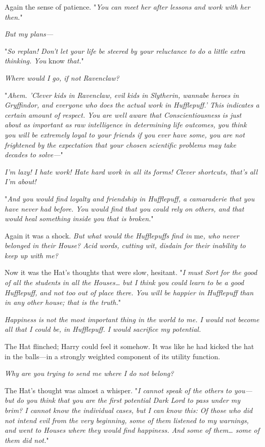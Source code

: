 Again the sense of patience. "\emph{You can meet her after lessons and work 
with her then.}"

\emph{But my plans---}

"\emph{So replan! Don't let your life be steered by your reluctance to do a 
little extra thinking. You} know\emph{ that.}"

\emph{Where would I go, if not Ravenclaw?}

"\emph{Ahem. 'Clever kids in Ravenclaw, evil kids in Slytherin, wannabe heroes 
in Gryffindor, and everyone who does the actual work in Hufflepuff.' This 
indicates a certain amount of respect. You are well aware that 
Conscientiousness is just about as important as raw intelligence in determining 
life outcomes, you think you will be extremely loyal to your friends if you 
ever have some, you are not frightened by the expectation that your chosen 
scientific problems may take decades to solve---}"

\emph{I'm lazy! I hate work! Hate hard work in all its forms! Clever shortcuts, 
that's all I'm about!}

"\emph{And you would find loyalty and friendship in Hufflepuff, a camaraderie 
that you have never had before. You would find that you could rely on others, 
and that would heal something inside you that is broken.}"

Again it was a shock. \emph{But what would the Hufflepuffs find in} me\emph{, 
who never belonged in their House? Acid words, cutting wit, disdain for their 
inability to keep up with me?}

Now it was the Hat's thoughts that were slow, hesitant. "\emph{I must Sort for 
the good of all the students in all the Houses{\ldots} but I think you could 
learn to be a good Hufflepuff, and not too out of place there. You will be 
happier in Hufflepuff than in any other house; that is the truth.}"

\emph{Happiness is not the most important thing in the world to me. I would not 
become all that I could be, in Hufflepuff. I would sacrifice my potential.}

The Hat flinched; Harry could feel it somehow. It was like he had kicked the 
hat in the balls---in a strongly weighted component of its utility function.

\emph{Why are you trying to send me where I do not belong?}

The Hat's thought was almost a whisper. "\emph{I cannot speak of the others to 
you---but do you think that you are the first potential Dark Lord to pass under 
my brim? I cannot know the individual cases, but I can know this: Of those who 
did not intend evil from the very beginning, some of them listened to my 
warnings, and went to Houses where they would find happiness. And some of 
them{\ldots} some of them did not.}"

